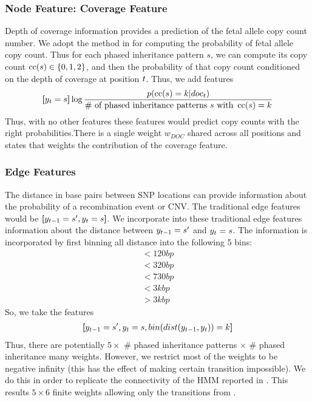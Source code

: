 \subsubsection{Node Feature: Coverage Feature}
Depth of coverage information provides a prediction of the fetal allele copy count number. We adopt the method in \citet{rampasek2014fcnv}  for computing the probability of fetal allele copy count. Thus for each phased inheritance pattern $s$, we can compute its copy count $\operatorname*{cc}(s) \in \{0, 1, 2\}$, and then the probability of that copy count conditioned on the depth of coverage at position $t$. Thus, we add features
\begin{align*}
\bm{[}y_{t} = s\bm{]}\log \frac{p(\operatorname*{cc}(s) = k | doc_{t})}{\text{\# of phased inheritance patterns $s$ with } \operatorname*{cc}(s) = k}
\end{align*}
Thus, with no other features these features would predict copy counts with the right probabilities.There is a single weight $w_{DOC}$ shared across all positions and states that weights the contribution of the coverage feature.

\subsubsection{Edge Features}
The distance in base pairs between SNP locations can provide information about the probability of a recombination event or CNV. The traditional edge features would be $\bm{[}y_{t-1} = s^{\prime} , y_{t} = s\bm{]}$. We incorporate into these traditional edge features information about the distance between $y_{t-1} = s^{\prime}$ and $y_{t} = s$. The information is incorporated by first binning all distance into the following 5 bins: 
\begin{align*}
< 120 bp\\
< 320 bp\\
< 730 bp\\
< 3k bp\\
> 3k bp
\end{align*}
So, we take the features
\begin{align*}
\bm{[}y_{t-1} = s^{\prime} , y_{t} = s, bin(dist(y_{t-1} , y_{t} )) = k\bm{]}
\end{align*}
Thus, there are potentially $5 \times $ \# phased inheritance patterns $\times $ \# phased inheritance many weights. However, we restrict most of the weights to be negative infinity (this has the effect of making certain transition impossible). We do this in order to replicate the connectivity of the HMM reported in \citet{rampasek2014fcnv}. This results $5 \times 6$ finite weights allowing only the transitions from \citet{rampasek2014fcnv}.

